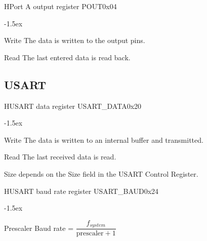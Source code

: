 \documentclass[12pt]{article}
\begin{document}
\begin{register}{H}{Port A output register POUT}{0x04}%
\label{poutx}%
\regnewline%
\end{register}
\begin{regdesc}[0.6\textwidth]\begin{reglist}[000000000]
\itemsep-1.5ex
\item[Write] The data is written to the output pins.
\item[Read] The last entered data is read back.
\end{reglist}\end{regdesc}

\subsection{USART}

\begin{register}{H}{USART data register USART\_DATA}{0x20}
\label{usartdata}
%
%
\regnewline%
\end{register}
\begin{regdesc}[0.6\textwidth]\begin{reglist}[000000000]
\itemsep-1.5ex
\item[Write] The data is written to an internal buffer and transmitted.
\item[Read] The last received data is read.
\end{reglist}\end{regdesc}
\hspace*{2cm}Size depends on the Size field in the USART Control Register.

\begin{register}{H}{USART baud rate register USART\_BAUD}{0x24}
\label{usartbaud}
%
%
\regnewline%
\end{register}
\begin{regdesc}[0.6\textwidth]\begin{reglist}[000000000]
\itemsep-1.5ex
\item[Prescaler] Baud rate = $\dfrac{f_{system}}{\textrm{prescaler}+1}$
\end{reglist}\end{regdesc}
\end{document}
